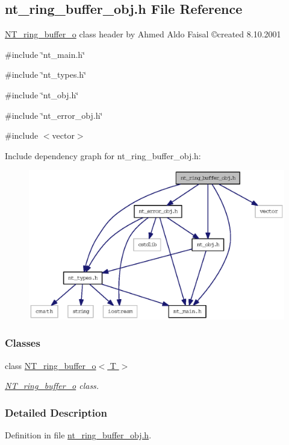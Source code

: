 \subsection{nt\_\-ring\_\-buffer\_\-obj.h File Reference}
\label{nt__ring__buffer__obj_8h}



\begin{DoxyItemize}
\item \hyperlink{class_n_t__ring__buffer__o}{NT\_\-ring\_\-buffer\_\-o} class header by Ahmed Aldo Faisal \copyright created 8.10.2001 
\end{DoxyItemize} 


{\ttfamily \#include \char`\"{}nt\_\-main.h\char`\"{}}\par
{\ttfamily \#include \char`\"{}nt\_\-types.h\char`\"{}}\par
{\ttfamily \#include \char`\"{}nt\_\-obj.h\char`\"{}}\par
{\ttfamily \#include \char`\"{}nt\_\-error\_\-obj.h\char`\"{}}\par
{\ttfamily \#include $<$vector$>$}\par
Include dependency graph for nt\_\-ring\_\-buffer\_\-obj.h:
\nopagebreak
\begin{figure}[H]
\begin{center}
\leavevmode
\includegraphics[width=400pt]{nt__ring__buffer__obj_8h__incl}
\end{center}
\end{figure}
\subsubsection*{Classes}
\begin{DoxyCompactItemize}
\item 
class \hyperlink{class_n_t__ring__buffer__o}{NT\_\-ring\_\-buffer\_\-o$<$ T $>$}
\begin{DoxyCompactList}\small\item\em \hyperlink{class_n_t__ring__buffer__o}{NT\_\-ring\_\-buffer\_\-o} class. \item\end{DoxyCompactList}\end{DoxyCompactItemize}


\subsubsection{Detailed Description}


Definition in file \hyperlink{nt__ring__buffer__obj_8h_source}{nt\_\-ring\_\-buffer\_\-obj.h}.

